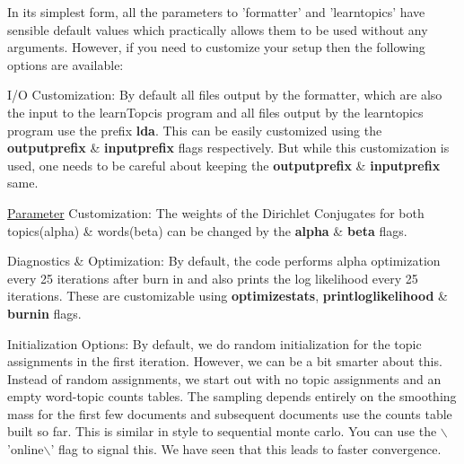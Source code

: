In its simplest form, all the parameters to 'formatter' and 'learntopics' have sensible default values which practically allows them to be used without any arguments. However, if you need to customize your setup then the following options are available: 
\begin{DoxyItemize}
\item 

I/O Customization: By default all files output by the formatter, which are also the input to the learnTopcis program and all files output by the learntopics program use the prefix {\bfseries lda}. This can be easily customized using the {\bfseries outputprefix} \& {\bfseries inputprefix} flags respectively. But while this customization is used, one needs to be careful about keeping the {\bfseries outputprefix} \& {\bfseries inputprefix} same.  
\item 

\hyperlink{struct_parameter}{Parameter} Customization: The weights of the Dirichlet Conjugates for both topics(alpha) \& words(beta) can be changed by the {\bfseries alpha} \& {\bfseries beta} flags.  
\item 

Diagnostics \& Optimization: By default, the code performs alpha optimization every 25 iterations after burn in and also prints the log likelihood every 25 iterations. These are customizable using {\bfseries optimizestats}, {\bfseries printloglikelihood} \& {\bfseries burnin} flags.  
\item 

Initialization Options: By default, we do random initialization for the topic assignments in the first iteration. However, we can be a bit smarter about this. Instead of random assignments, we start out with no topic assignments and an empty word-\/topic counts tables. The sampling depends entirely on the smoothing mass for the first few documents and subsequent documents use the counts table built so far. This is similar in style to sequential monte carlo. You can use the $\backslash$'online$\backslash$' flag to signal this. We have seen that this leads to faster convergence. 
\end{DoxyItemize}